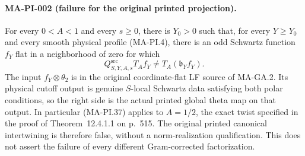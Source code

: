 \paragraph{MA-PI-002 (failure for the original printed projection).}
For every $0<A<1$ and every $s\geq0$, there is $Y_0>0$
such that, for every $Y\geq Y_0$ and every smooth physical
profile (MA-PI.4), there is an odd Schwartz function $f_Y$
flat in a neighborhood of zero for which
\[
 Q^{\mathrm{src}}_{S,Y,A,s}T_Af_Y
                     \ne T_A(\mathfrak b_Yf_Y).
 \tag{MA-PI.37}
\]
The input $f_Y\otimes\theta_2$ is in the original
coordinate-flat LF source of MA-GA.2.  Its physical
cutoff output is genuine $S$-local Schwartz data satisfying
both polar conditions, so the right side is the actual
printed global theta map on that output.
In particular (MA-PI.37) applies to $A=1/2$, the exact
twist specified in the proof of Theorem~12.4.1.1 on p.~515.
The original printed canonical intertwining is therefore
false, without a norm-realization qualification.
This does not assert the failure of every different
Gram-corrected factorization.

